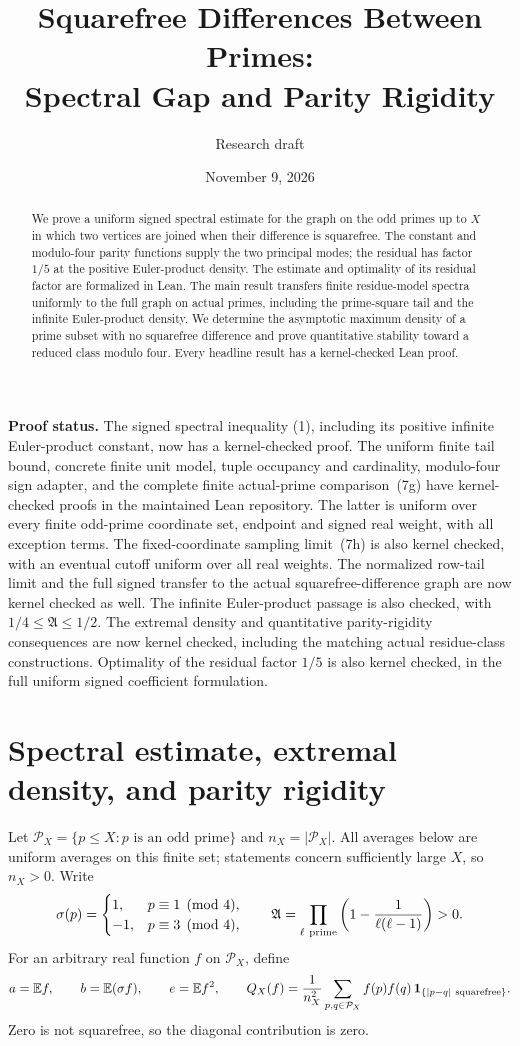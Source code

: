 \documentclass[11pt]{article}
\title{Squarefree Differences Between Primes:\\Spectral Gap and Parity Rigidity}
\author{Research draft}
\date{November 9, 2026}
\newcommand{\Pcal}{\mathcal P}
\newcommand{\E}{\mathbb E}
\newcommand{\Aconst}{\mathfrak A}
\begin{document}
\maketitle
\begin{abstract}
We prove a uniform signed spectral estimate for the graph on the odd
primes up to \(X\) in which two vertices are joined when their difference
is squarefree. The constant and modulo-four parity functions supply the
two principal modes; the residual has factor \(1/5\) at the positive
Euler-product density. The estimate and optimality of its residual factor
are formalized in Lean.
The main result transfers finite residue-model spectra uniformly to the
full graph on actual primes, including the prime-square tail and the
infinite Euler-product density.
We determine the asymptotic maximum density of a prime subset with no
squarefree difference and prove quantitative stability toward a reduced
class modulo four. Every headline result has a kernel-checked Lean proof.
\end{abstract}

\noindent\textbf{Proof status.}
The signed spectral inequality (1), including its positive infinite
Euler-product constant, now has a kernel-checked proof.
The uniform finite tail bound, concrete finite unit model, tuple occupancy
and cardinality, modulo-four sign adapter, and the complete finite
actual-prime comparison~(7g) have kernel-checked proofs in the maintained
Lean repository. The latter is uniform over every finite odd-prime
coordinate set, endpoint and signed real weight, with all exception terms.
The fixed-coordinate sampling limit~(7h) is also kernel checked, with
an eventual cutoff uniform over all real weights.
The normalized row-tail limit and the full signed transfer to the actual
squarefree-difference graph are now kernel checked as well.
The infinite Euler-product passage is also checked, with
\(1/4\le\Aconst\le1/2\).
The extremal density and quantitative parity-rigidity consequences are now
kernel checked, including the matching actual residue-class constructions.
Optimality of the residual factor \(1/5\) is also kernel checked, in the
full uniform signed coefficient formulation.

\section{Spectral estimate, extremal density, and parity rigidity}

Let \(\Pcal_X=\{p\le X:p\text{ is an odd prime}\}\) and
\(n_X=|\Pcal_X|\). All averages below are uniform averages on this
finite set; statements concern sufficiently large \(X\), so \(n_X>0\).
Write
\[
 \sigma(p)=
 \begin{cases}1,&p\equiv1\pmod4,\\-1,&p\equiv3\pmod4,\end{cases}
 \qquad
 \Aconst=\prod_{\ell\ {\rm prime}}
       \left(1-\frac1{\ell(\ell-1)}\right)>0 .
\]
For an arbitrary real function \(f\) on \(\Pcal_X\), define
\[
 a=\E f,\qquad b=\E(\sigma f),\qquad e=\E f^2,\qquad
 Q_X(f)=\frac1{n_X^2}\sum_{p,q\in\Pcal_X}
   f(p)f(q)\,\mathbf1_{\{|p-q|\ {\rm squarefree}\}}.
\]
Zero is not squarefree, so the diagonal contribution is zero.
\end{document}
